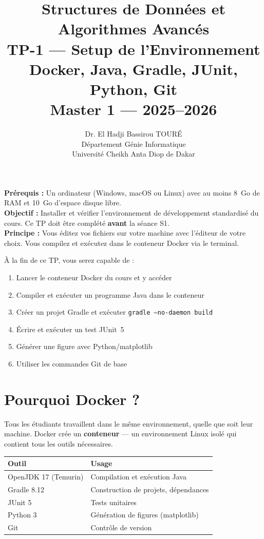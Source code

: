 \documentclass[11pt,a4paper]{article}
\title{%
\vspace{-1cm}
\textbf{\LARGE Structures de Données et}\\
\textbf{\LARGE Algorithmes Avancés}\\[0.8cm]
\textbf{\huge TP-1 --- Setup de l'Environnement}\\[0.3cm]
\textbf{\Large Docker, Java, Gradle, JUnit, Python, Git}\\[0.5cm]
\large Master 1 --- 2025--2026}
\author{Dr. El Hadji Bassirou TOURÉ\\
Département Génie Informatique\\
Université Cheikh Anta Diop de Dakar}
\date{}
\begin{document}
\maketitle
\thispagestyle{empty}

\begin{prereqbox}
\textbf{Prérequis :} Un ordinateur (Windows, macOS ou Linux) avec au moins 8~Go de RAM et 10~Go d'espace disque libre.\\[4pt]
\textbf{Objectif :} Installer et vérifier l'environnement de développement standardisé du cours. Ce TP doit être complété \textbf{avant} la séance S1.\\[4pt]
\textbf{Principe :} Vous éditez vos fichiers sur votre machine avec l'éditeur de votre choix. Vous compilez et exécutez dans le conteneur Docker via le terminal.
\end{prereqbox}

\begin{objectifbox}
À la fin de ce TP, vous serez capable de :
\begin{enumerate}[nosep]
    \item Lancer le conteneur Docker du cours et y accéder
    \item Compiler et exécuter un programme Java dans le conteneur
    \item Créer un projet Gradle et exécuter \texttt{gradle --no-daemon build}
    \item Écrire et exécuter un test JUnit~5
    \item Générer une figure avec Python/matplotlib
    \item Utiliser les commandes Git de base
\end{enumerate}
\end{objectifbox}

\tableofcontents
\newpage

\section{Pourquoi Docker ?}

Tous les étudiants travaillent dans le même environnement, quelle que soit leur machine. Docker crée un \textbf{conteneur} --- un environnement Linux isolé qui contient tous les outils nécessaires.

\begin{center}
\renewcommand{\arraystretch}{1.3}
\begin{tabular}{@{}l l@{}}
\toprule
\textbf{Outil} & \textbf{Usage} \\
\midrule
OpenJDK 17 (Temurin) & Compilation et exécution Java \\
Gradle 8.12 & Construction de projets, dépendances \\
JUnit 5 & Tests unitaires \\
Python 3 & Génération de figures (matplotlib) \\
Git & Contrôle de version \\
\bottomrule
\end{tabular}
\end{center}
\end{document}
